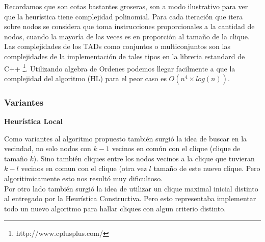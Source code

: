 Recordamos que son cotas bastantes groseras, son a modo ilustrativo para ver que la heurística tiene complejidad polinomial. Para cada iteración que itera sobre nodos se considera que toma instrucciones proporcionales a la cantidad de nodos, cuando la mayoría de las veces es en proporción al tamaño de la clique. Las complejidades de los TADs como conjuntos o multiconjuntos son las complejidades de la implementación de tales tipos en la libreria estandard de C++ \footnote{http://www.cplusplus.com/}.
Utilizando algebra de Ordenes podemos llegar facilmente a que la complejidad del algoritmo (HL) para el peor caso es $O(n^4 \times log(n)) $.

\subsubsection{Variantes}

\textbf{Heurística Local}

Como variantes al algoritmo propuesto también surgió la idea de buscar en la vecindad, no solo nodos con  $k-1$ vecinos en común con el clique (clique de tamaño $k$). Sino también cliques entre los nodos vecinos a la clique que tuvieran $k-l$ vecinos en comun con el clique (otra vez $l$ tamaño de este nuevo clique. Pero algoritimicamente esto nos resultó muy dificultoso.
\\
Por otro lado también surgió la idea de utilizar un clique maximal inicial distinto al entregado por la Heurística Constructiva. Pero esto representaba implementar todo un nuevo algoritmo para hallar cliques con algun criterio distinto.
